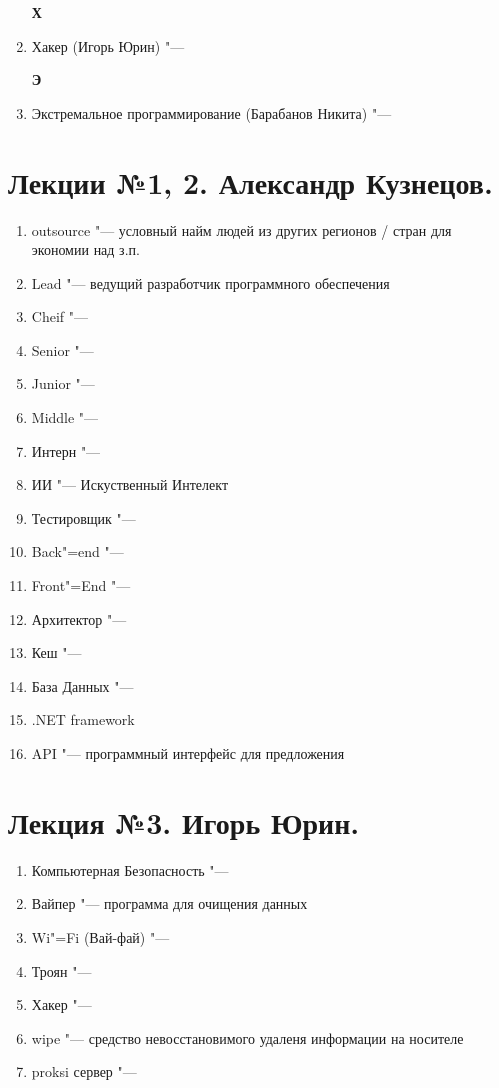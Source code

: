 \documentclass{article}
\begin{document}
\begin{enumerate}
    \textbf{Х}
    \item {Хакер (Игорь Юрин) "---}

    \textbf{Э}
    \item {Экстремальное программирование (Барабанов Никита) "---}

\end{enumerate}

\section{Лекции №1, 2. Александр Кузнецов.}
\begin{enumerate}
    \item outsource "--- условный найм людей из других регионов / стран для экономии над з.п.
    \item Lead "--- ведущий разработчик программного обеспечения
    \item Cheif "---
    \item Senior "---
    \item Junior "---
    \item Middle "---
    \item Интерн "---
    \item ИИ "--- Искуственный Интелект
    \item Тестировщик "---
    \item Back"=end "---
    \item Front"=End "---
    \item Архитектор "---
    \item Кеш "---
    \item База Данных "---
    \item .NET framework
    \item API "--- программный интерфейс для предложения
\end{enumerate}

\section{Лекция №3. Игорь Юрин.}
\begin{enumerate}
    \item Компьютерная Безопасность "---
    \item Вайпер "--- программа для очищения данных
    \item Wi"=Fi (Вай-фай) "---
    \item Троян "---
    \item Хакер "---
    \item wipe "--- средство невосстановимого удаленя информации на носителе
    \item proksi сервер "---
\end{enumerate}
\end{document}
